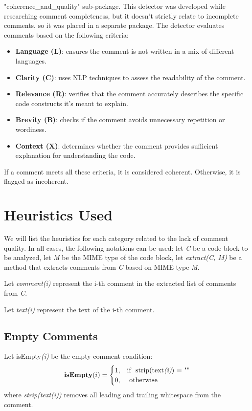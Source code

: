 \noindent "coherence\_and\_quality" sub-package. This detector was developed while researching comment completeness, but it doesn’t strictly relate to incomplete comments, so it was placed in a separate package. The detector evaluates comments based on the following criteria:
	\begin{itemize}
		\item \textbf{Language (L)}: ensures the comment is not written in a mix of different languages.
		\item \textbf{Clarity (C)}: uses NLP techniques to assess the readability of the comment.
		\item \textbf{Relevance (R)}: verifies that the comment accurately describes the specific code constructs it’s meant to explain.
		\item \textbf{Brevity (B)}: checks if the comment avoids unnecessary repetition or wordiness.
		\item \textbf{Context (X)}: determines whether the comment provides sufficient explanation for understanding the code.
	\end{itemize}
If a comment meets all these criteria, it is considered coherent. Otherwise, it is flagged as incoherent.
	
\section{Heuristics Used}
We will list the heuristics for each category related to the lack of comment quality.
In all cases, the following notations can be used: let \textit{C} be a code block to be analyzed, let \textit{M} be the MIME type of the code block, let \textit{extract(C, M)} be a method that extracts comments from \textit{C} based on MIME type \textit{M}.

\noindent Let \textit{comment(i)} represent the i-th comment in the extracted list of comments from \textit{C}.

\noindent Let \textit{text(i)} represent the text of the i-th comment.

\subsection{Empty Comments}
\noindent Let isEmpty\textit{(i)} be the empty comment condition: 
\begin{equation*}
	\textbf{isEmpty}(i) = \begin{cases}
		1, & \text{if } \text{ strip(text\textit{(i)}) = ""} \\
		0, & \text{ otherwise}
	\end{cases}
\end{equation*}
where \textit{strip(text(i))} removes all leading and trailing whitespace from the comment.

